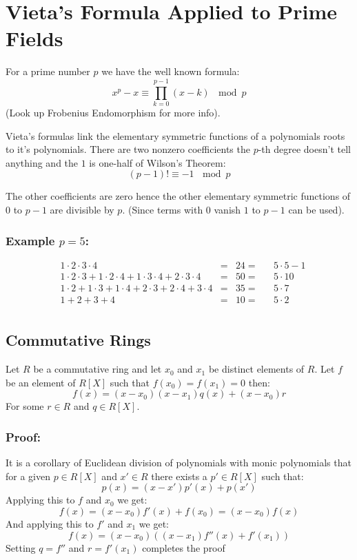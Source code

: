 
\section{Vieta's Formula Applied to Prime Fields}
For a prime number $p$ we have the well known formula:
\[x^p-x \equiv \prod_{k=0}^{p-1}(x-k)\,\mod p\]
(Look up Frobenius Endomorphism for more info).

Vieta's formulas link the elementary symmetric functions of a polynomials roots to it's polynomials.
There are two nonzero coefficients the $p$-th degree doesn't tell anything and the $1$ is one-half of Wilson's Theorem:
\[(p-1)! \equiv -1\,\mod p\]

The other coefficients are zero hence the other elementary symmetric functions of $0$ to $p-1$ are divisible by $p$.
(Since terms with $0$ vanish $1$ to $p-1$ can be used).

\subsubsection{Example $p=5$:}
\begin{equation*}
\begin{aligned}
	&1\cdot2\cdot3\cdot 4 &=& 24 =&&5\cdot5-1\\
	&1\cdot2\cdot3 + 1\cdot2\cdot4+1\cdot3\cdot4+2\cdot3\cdot4&=& 50 =&& 5\cdot 10\\
	&1\cdot2+1\cdot3+1\cdot4+2\cdot3+2\cdot4+3\cdot4 &=& 35 =&&5\cdot 7\\
	&1+2+3+4 &=& 10 =&&5\cdot 2\\
\end{aligned}
\end{equation*}

\subsection{Commutative Rings}
Let $R$ be a commutative ring and let $x_0$ and $x_1$ be distinct elements of $R$.
Let $f$ be an element of $R[X]$ such that $f(x_0)=f(x_1) = 0$ then:
\[f(x) = (x-x_0)(x-x_1)q(x)+(x-x_0)r\]
For some $r\in R$ and $q \in R[X]$.
\\

\subsubsection{Proof:}
It is a corollary of Euclidean division of polynomials with monic polynomials that for a given $p\in R[X]$ and $x'\in R$ there exists a $p' \in R[X]$ such that:
\[p(x) = (x-x')p'(x)+p(x')\]
Applying this to $f$ and $x_0$ we get:
\[f(x) = (x-x_0)f'(x) + f(x_0) = (x-x_0)f(x)\]
And applying this to $f'$ and $x_1$ we get:
\[f(x) = (x-x_0)((x-x_1)f''(x)+f'(x_1))\]
Setting $q=f''$ and $r=f'(x_1)$ completes the proof

